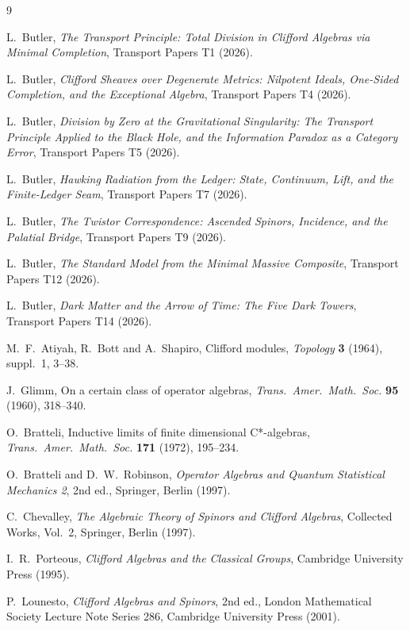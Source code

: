 \documentclass[11pt]{article}
\theoremstyle{definition}
\begin{document}
\begin{thebibliography}{9}

L.~Butler,
\emph{The Transport Principle: Total Division in Clifford Algebras via Minimal Completion},
Transport Papers T1 (2026).

L.~Butler,
\emph{Clifford Sheaves over Degenerate Metrics: Nilpotent Ideals, One-Sided Completion, and the Exceptional Algebra},
Transport Papers T4 (2026).

L.~Butler,
\emph{Division by Zero at the Gravitational Singularity: The Transport Principle Applied to the Black Hole, and the Information Paradox as a Category Error},
Transport Papers T5 (2026).

L.~Butler,
\emph{Hawking Radiation from the Ledger: State, Continuum, Lift, and the Finite-Ledger Seam},
Transport Papers T7 (2026).

L.~Butler,
\emph{The Twistor Correspondence: Ascended Spinors, Incidence, and the Palatial Bridge},
Transport Papers T9 (2026).

L.~Butler,
\emph{The Standard Model from the Minimal Massive Composite},
Transport Papers T12 (2026).

L.~Butler,
\emph{Dark Matter and the Arrow of Time: The Five Dark Towers},
Transport Papers T14 (2026).

M.~F.~Atiyah, R.~Bott and A.~Shapiro,
Clifford modules,
\emph{Topology} \textbf{3} (1964), suppl.~1, 3--38.

J.~Glimm,
On a certain class of operator algebras,
\emph{Trans.\ Amer.\ Math.\ Soc.} \textbf{95} (1960), 318--340.

O.~Bratteli,
Inductive limits of finite dimensional C*-algebras,
\emph{Trans.\ Amer.\ Math.\ Soc.} \textbf{171} (1972), 195--234.

O.~Bratteli and D.~W.~Robinson,
\emph{Operator Algebras and Quantum Statistical Mechanics 2}, 2nd ed.,
Springer, Berlin (1997).

C.~Chevalley,
\emph{The Algebraic Theory of Spinors and Clifford Algebras},
Collected Works, Vol.~2, Springer, Berlin (1997).

I.~R.~Porteous,
\emph{Clifford Algebras and the Classical Groups},
Cambridge University Press (1995).

P.~Lounesto,
\emph{Clifford Algebras and Spinors}, 2nd ed.,
London Mathematical Society Lecture Note Series 286, Cambridge University Press (2001).


\end{thebibliography}
\end{document}
